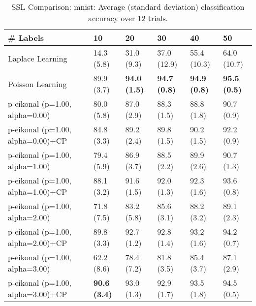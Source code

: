 \documentclass{article}
\begin{document}
\begin{table*}[t!]
\vspace{-3mm}
\caption{SSL Comparison: mnist: Average (standard deviation) classification accuracy over 12 trials.}
\vspace{-3mm}
\label{tab:SSL Comparison: mnist}
\vskip 0.15in
\begin{center}
\begin{small}
\begin{sc}
\begin{tabular}{llllll}
\toprule
\# Labels&\textbf{10}&\textbf{20}&\textbf{30}&\textbf{40}&\textbf{50}\\
\midrule
Laplace Learning&14.3 (5.8)      &31.0 (9.3)      &37.0 (12.9)      &55.4 (10.3)      &64.0 (10.7)      \\
Poisson Learning&89.9 (3.7)      &{\bf 94.0 (1.5)}&{\bf 94.7 (0.8)}&{\bf 94.9 (0.8)}&{\bf 95.5 (0.5)}\\
p-eikonal (p=1.00, alpha=0.00)&80.0 (5.8)      &87.0 (2.9)      &88.3 (1.5)      &88.8 (1.8)      &90.7 (0.9)      \\
p-eikonal (p=1.00, alpha=0.00)+CP&84.8 (3.3)      &89.2 (2.4)      &89.8 (1.5)      &90.2 (1.5)      &92.2 (0.9)      \\
p-eikonal (p=1.00, alpha=1.00)&79.4 (5.9)      &86.9 (3.7)      &88.5 (2.2)      &89.9 (2.6)      &90.7 (1.3)      \\
p-eikonal (p=1.00, alpha=1.00)+CP&88.1 (3.2)      &91.6 (1.5)      &92.0 (1.3)      &92.3 (1.6)      &93.6 (0.8)      \\
p-eikonal (p=1.00, alpha=2.00)&71.8 (7.5)      &83.2 (5.8)      &85.6 (3.1)      &88.2 (3.2)      &89.1 (2.3)      \\
p-eikonal (p=1.00, alpha=2.00)+CP&89.8 (3.3)      &92.7 (1.2)      &92.8 (1.4)      &93.2 (1.6)      &94.2 (0.7)      \\
p-eikonal (p=1.00, alpha=3.00)&62.2 (8.6)      &78.4 (7.2)      &81.8 (3.5)      &85.4 (3.7)      &87.1 (2.9)      \\
p-eikonal (p=1.00, alpha=3.00)+CP&{\bf 90.6 (3.4)}&93.0 (1.3)      &92.9 (1.7)      &93.5 (1.8)      &94.5 (0.5)      \\
\bottomrule
\end{tabular}
\end{sc}
\end{small}
\end{center}
\vskip -0.1in
\end{table*}
\end{document}
